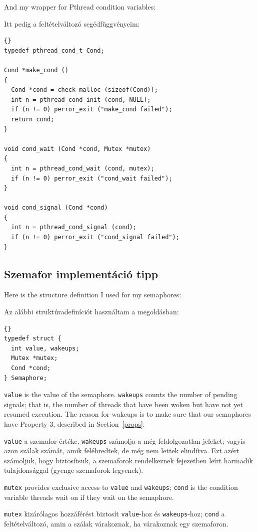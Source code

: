\documentclass{book}
\newcommand{\clearemptydoublepage}{\newpage\cleardoublepage}
\begin{document}
\newpage
And my wrapper for Pthread condition variables:

Itt pedig a feltételváltozó segédfüggvényeim:

\begin{lstlisting}[title={}]{}
typedef pthread_cond_t Cond;

Cond *make_cond ()
{
  Cond *cond = check_malloc (sizeof(Cond)); 
  int n = pthread_cond_init (cond, NULL);
  if (n != 0) perror_exit ("make_cond failed");
  return cond;
}

void cond_wait (Cond *cond, Mutex *mutex)
{
  int n = pthread_cond_wait (cond, mutex);
  if (n != 0) perror_exit ("cond_wait failed");
}

void cond_signal (Cond *cond)
{
  int n = pthread_cond_signal (cond);
  if (n != 0) perror_exit ("cond_signal failed");
}
\end{lstlisting}



\clearemptydoublepage
\subsection{Szemafor implementáció tipp}

Here is the structure definition I used for my semaphores:

Az alábbi struktúradefiníciót használtam a megoldásban:

\begin{lstlisting}[title={}]{}
typedef struct {
  int value, wakeups;
  Mutex *mutex;
  Cond *cond;
} Semaphore;
\end{lstlisting}

{\tt value} is the value of the semaphore.  {\tt wakeups} counts
the number of pending signals; that is, the number of threads
that have been woken but have not yet resumed execution.  The reason
for wakeups is to make sure that our semaphores have
Property 3, described in Section~\ref{props}.

{\tt value} a szemafor értéke.  {\tt wakeups} számolja
a még feldolgozatlan jeleket; vagyis azon szálak számát, amik
felébredtek, de még nem lettek elindítva.
Ezt azért számoljuk, hogy biztosítsuk, a szemaforok rendelkeznek
 fejezetben leírt harmadik tulajdonsággal (gyenge szemaforok legyenek).

{\tt mutex} provides exclusive access to {\tt value} and
{\tt wakeups}; {\tt cond} is the condition variable threads
wait on if they wait on the semaphore.

{\tt mutex} kizárólagos hozzáférést biztosít {\tt value}-hoz és
{\tt wakeups}-hoz; {\tt cond} a feltételváltozó, amin a szálak
várakoznak, ha várakoznak egy szemaforon.
\end{document}
